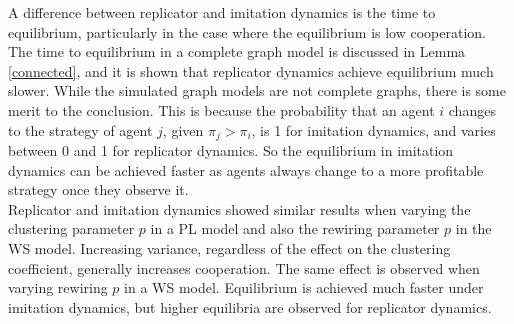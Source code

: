 A difference between replicator and imitation dynamics is the time to equilibrium, particularly in the case where the equilibrium is low cooperation. The time to equilibrium in a complete graph model is discussed in Lemma \ref{connected}, and it is shown that replicator dynamics achieve equilibrium much slower. While the simulated graph models are not complete graphs, there is some merit to the conclusion. This is because the probability that an agent $i$ changes to the strategy of agent $j$, given $\pi_j>\pi_i$, is 1 for imitation dynamics, and varies between 0 and 1 for replicator dynamics. So the equilibrium in imitation dynamics can be achieved faster as agents always change to a more profitable strategy once they observe it. \\



Replicator and imitation dynamics showed similar results when varying the clustering parameter $p$ in a PL model and also the rewiring parameter $p$ in the WS model. Increasing variance, regardless of the effect on the clustering coefficient, generally increases cooperation. The same effect is observed when varying rewiring $p$ in a WS model. Equilibrium is achieved much faster under imitation dynamics, but higher equilibria are observed for replicator dynamics.  \\










